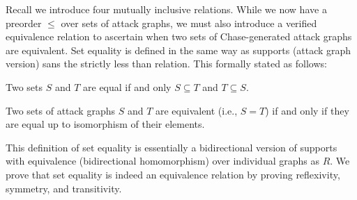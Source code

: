 \documentclass[runningheads]{llncs}
\theoremstyle{definition}
\begin{document}
Recall we introduce four mutually inclusive relations. While we now have a preorder $\leq$ over sets of attack graphs, we must also introduce a verified equivalence relation to ascertain when two sets of Chase-generated attack graphs are equivalent. Set equality is defined in the same way as supports (attack graph version) sans the strictly less than relation. This formally stated as follows: 

\begin{definition}
  Two sets $S$ and $T$ are equal if and only $S \subseteq T$ and $T \subseteq S$.
\end{definition}

\begin{definition}[Equivalence =]
    Two sets of attack graphs $S$ and $T$ are equivalent (i.e., $S = T$) if and only if they are equal up to isomorphism of their elements.
\end{definition}

This definition of set equality is essentially a bidirectional version of supports with equivalence (bidirectional homomorphism) over individual graphs as $R$. We prove that set equality is indeed an equivalence relation by proving reflexivity, symmetry, and transitivity. 


\end{document}
